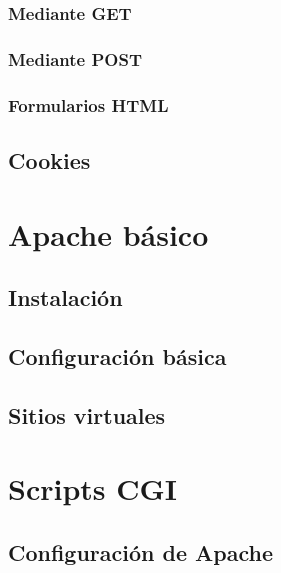 \documentclass[a4paper,11pt,spanish]{sphinxmanual}
\begin{document}
\subsubsection{Mediante GET}
\label{\detokenize{introduccion:mediante-get}}

\subsubsection{Mediante POST}
\label{\detokenize{introduccion:mediante-post}}

\subsubsection{Formularios HTML}
\label{\detokenize{introduccion:formularios-html}}

\subsection{Cookies}
\label{\detokenize{introduccion:cookies}}

\section{Apache básico}
\label{\detokenize{introduccion:apache-basico}}

\subsection{Instalación}
\label{\detokenize{introduccion:instalacion}}

\subsection{Configuración básica}
\label{\detokenize{introduccion:configuracion-basica}}

\subsection{Sitios virtuales}
\label{\detokenize{introduccion:sitios-virtuales}}

\section{Scripts CGI}
\label{\detokenize{introduccion:scripts-cgi}}

\subsection{Configuración de Apache}
\label{\detokenize{introduccion:configuracion-de-apache}}
\end{document}
